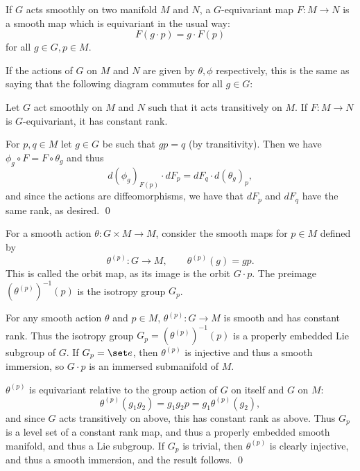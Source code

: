     If $G$ acts smoothly on two manifold $M$ and $N$, a {\emphcolor $G$-equivariant} map $F\colon M\to N$ is a smooth map which is equivariant
    in the usual way:
    $$ F(g\cdot p) = g\cdot F(p) $$
    for all $g\in G,p\in M$.

\edefn

If the actions of $G$ on $M$ and $N$ are given by $\theta,\phi$ respectively, this is the same as saying that the following diagram commutes for
all $g\in G$:

\centerline{}

\bthrm

    Let $G$ act smoothly on $M$ and $N$ such that it acts transitively on $M$.
    If $F\colon M\to N$ is $G$-equivariant, it has constant rank.

\ethrm

\bproof

    For $p,q\in M$ let $g\in G$ be such that $gp=q$ (by transitivity).
    Then we have $\phi_g\circ F=F\circ\theta_g$ and thus
    $$ d(\phi_g)_{F(p)}\cdot dF_p = dF_q\cdot d(\theta_g)_p , $$
    and since the actions are diffeomorphisms, we have that $dF_p$ and $dF_q$ have the same rank, as desired.
    \qed

\eproof

For a smooth action $\theta\colon G\times M\to M$, consider the smooth maps for $p\in M$ defined by
$$ \theta^{(p)}\colon G\to M,\qquad \theta^{(p)}(g) = gp . $$
This is called the {\emphcolor orbit map}, as its image is the orbit $G\cdot p$.
The preimage $(\theta^{(p)})^{-1}(p)$ is the isotropy group $G_p$.

\bcoro

    For any smooth action $\theta$ and $p\in M$, $\theta^{(p)}\colon G\to M$ is smooth and has constant rank.
    Thus the isotropy group $G_p=(\theta^{(p)})^{-1}(p)$ is a properly embedded Lie subgroup of $G$.
    If $G_p=\set e$, then $\theta^{(p)}$ is injective and thus a smooth immersion, so $G\cdot p$ is an immersed submanifold of $M$.

\ecoro

\bproof

    $\theta^{(p)}$ is equivariant relative to the group action of $G$ on itself and $G$ on $M$:
    $$ \theta^{(p)}(g_1g_2) = g_1g_2p = g_1\theta^{(p)}(g_2) , $$
    and since $G$ acts transitively on above, this has constant rank as above.
    Thus $G_p$ is a level set of a constant rank map, and thus a properly embedded smooth manifold, and thus a Lie subgroup.
    If $G_p$ is trivial, then $\theta^{(p)}$ is clearly injective, and thus a smooth immersion, and the result follows.
    \qed

